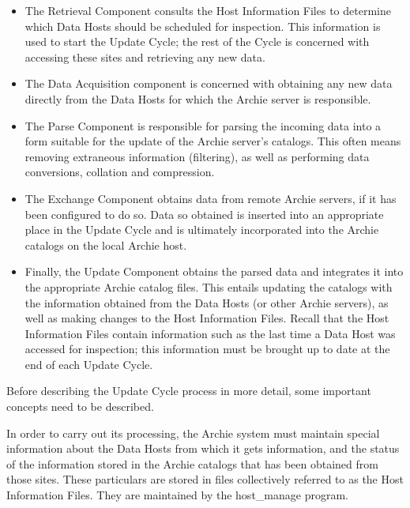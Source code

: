 \begin{itemize}

\item
The Retrieval Component consults the Host Information Files to determine
which Data Hosts should be scheduled for inspection. This information is used
to start the Update Cycle; the rest of the Cycle is
concerned with accessing these sites and retrieving any new data.

\item
The Data Acquisition component is concerned with obtaining any new data
directly from the Data Hosts for which the Archie server is responsible.

\item
The Parse Component is responsible for parsing the incoming data into a form
suitable for the update of the Archie server's catalogs. This often means
removing extraneous information (filtering), as well as performing data
conversions, collation and compression.

\item
The Exchange Component obtains data from remote Archie
servers, if it has been configured to do so. Data so obtained is inserted into
an appropriate place in the Update Cycle and is ultimately incorporated into
the Archie catalogs on the local Archie host.

\item
 Finally, the Update Component obtains the parsed data and integrates it into
the appropriate Archie catalog files. This entails updating the catalogs with
the information obtained from the Data Hosts (or other Archie servers), as
well as making changes to the Host Information Files. Recall that the Host
Information Files contain information such as the last time a Data Host was
accessed for inspection; this information must be brought up to date at the
end of each Update Cycle.

\end{itemize}


Before describing the Update Cycle process in more detail, some important
concepts need to be described.

In order to carry out its processing, the Archie system must maintain special
information about the Data Hosts from which it gets information, and the
status of the information stored in the Archie catalogs that has been obtained
from those sites. These particulars are stored in files collectively referred
to as the Host Information Files. They are maintained by the host\_manage
program.


